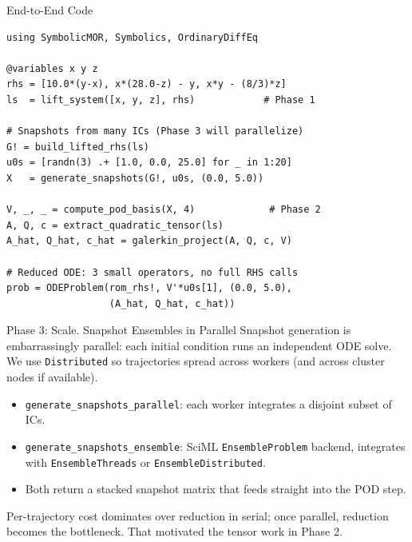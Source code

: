 \documentclass[aspectratio=169,10pt]{beamer}
\begin{document}
\begin{frame}[fragile]{End-to-End Code}
\begin{lstlisting}
using SymbolicMOR, Symbolics, OrdinaryDiffEq

@variables x y z
rhs = [10.0*(y-x), x*(28.0-z) - y, x*y - (8/3)*z]
ls  = lift_system([x, y, z], rhs)            # Phase 1

# Snapshots from many ICs (Phase 3 will parallelize)
G! = build_lifted_rhs(ls)
u0s = [randn(3) .+ [1.0, 0.0, 25.0] for _ in 1:20]
X   = generate_snapshots(G!, u0s, (0.0, 5.0))

V, _, _ = compute_pod_basis(X, 4)             # Phase 2
A, Q, c = extract_quadratic_tensor(ls)
A_hat, Q_hat, c_hat = galerkin_project(A, Q, c, V)

# Reduced ODE: 3 small operators, no full RHS calls
prob = ODEProblem(rom_rhs!, V'*u0s[1], (0.0, 5.0),
                  (A_hat, Q_hat, c_hat))
\end{lstlisting}
\end{frame}


\begin{frame}{Phase 3: Scale. Snapshot Ensembles in Parallel}
  Snapshot generation is embarrassingly parallel: each initial condition runs an independent ODE solve. We use \texttt{Distributed} so trajectories spread across workers (and across cluster nodes if available).

  \medskip
  \begin{itemize}
    \item \texttt{generate\_snapshots\_parallel}: each worker integrates a disjoint subset of ICs.
    \item \texttt{generate\_snapshots\_ensemble}: SciML \texttt{EnsembleProblem} backend, integrates with \texttt{EnsembleThreads} or \texttt{EnsembleDistributed}.
    \item Both return a stacked snapshot matrix that feeds straight into the POD step.
  \end{itemize}

  \medskip
  Per-trajectory cost dominates over reduction in serial; once parallel, reduction becomes the bottleneck. That motivated the tensor work in Phase 2.
\end{frame}
\end{document}
